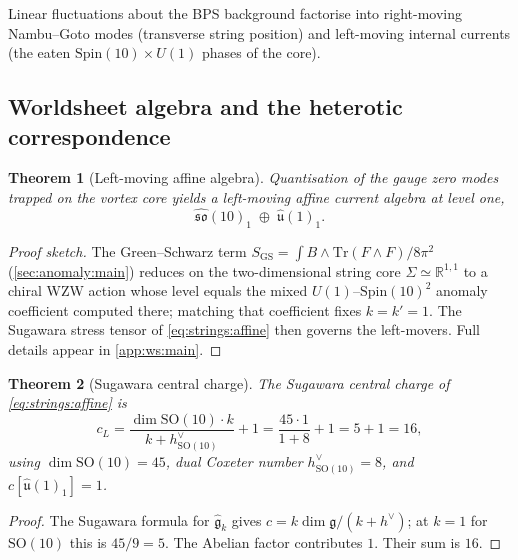 \documentclass[11pt]{article}
\theoremstyle{plain}
\newtheorem{theorem}{Theorem}[section]
\theoremstyle{definition}
\theoremstyle{remark}
\begin{document}
Linear fluctuations about the BPS background factorise into right-moving
Nambu--Goto modes (transverse string position) and left-moving internal
currents (the eaten $\mathrm{Spin}(10)\times U(1)$ phases of the core).

\subsection{Worldsheet algebra and the heterotic correspondence}
\label{sec:strings:worldsheet}

\begin{theorem}[Left-moving affine algebra]
\label{thm:strings:affine}
Quantisation of the gauge zero modes trapped on the vortex core yields a
left-moving affine current algebra at level one,
\begin{equation}
  \widehat{\mathfrak{so}}(10)_{1}\;\oplus\;\widehat{\mathfrak u}(1)_{1}.
  \label{eq:strings:affine}
\end{equation}
\end{theorem}

\begin{proof}[Proof sketch]
The Green--Schwarz term $S_{\mathrm{GS}}=\int B\wedge
\mathrm{Tr}(F\wedge F)/8\pi^{2}$ (\autoref{sec:anomaly:main}) reduces on
the two-dimensional string core $\Sigma\simeq\mathbb{R}^{1,1}$ to a
chiral WZW action whose level equals the mixed
$U(1)$--$\mathrm{Spin}(10)^{2}$ anomaly coefficient computed there;
matching that coefficient fixes $k=k'=1$. The Sugawara stress tensor of
\eqref{eq:strings:affine} then governs the left-movers. Full details
appear in \autoref{app:ws:main}.
\end{proof}

\begin{theorem}[Sugawara central charge]
\label{thm:strings:cl}
The Sugawara central charge of \eqref{eq:strings:affine} is
\begin{equation}
  c_{L}
   = \frac{\dim\mathrm{SO}(10)\cdot k}{k+h^{\vee}_{\mathrm{SO}(10)}}
     + 1
   = \frac{45\cdot 1}{1+8} + 1
   = 5 + 1
   = \boxed{16},
  \label{eq:strings:cL}
\end{equation}
using $\dim\mathrm{SO}(10)=45$, dual Coxeter number
$h^{\vee}_{\mathrm{SO}(10)}=8$, and $c[\widehat{\mathfrak u}(1)_{1}]=1$.
\end{theorem}

\begin{proof}
The Sugawara formula for $\widehat{\mathfrak g}_{k}$ gives
$c=k\dim\mathfrak g/(k+h^{\vee})$; at $k=1$ for
$\mathrm{SO}(10)$ this is $45/9=5$. The Abelian factor contributes $1$.
Their sum is $16$.
\end{proof}
\end{document}
